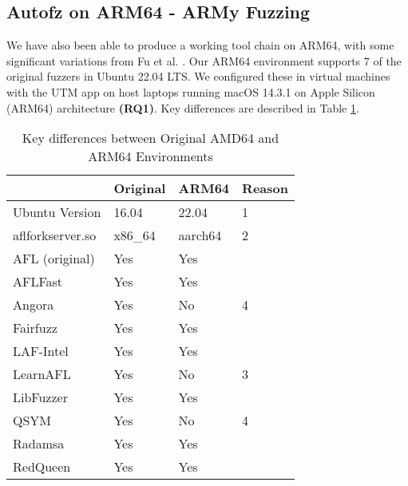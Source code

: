 \subsection{Autofz on ARM64 - ARMy Fuzzing}

We have also been able to produce a working tool chain on ARM64, with some significant 
variations from Fu et al. \cite{fu_autofz_2023}. Our ARM64 environment supports 7 of 
the original fuzzers in Ubuntu 22.04 LTS. We configured these in virtual machines 
with the UTM app on host laptops running macOS 14.3.1 on Apple Silicon (ARM64) 
architecture \textbf{(RQ1)}. Key differences are described in Table \ref{arm64-characteristics}.

\begin{table}[ht]
    \begin{tabular}{|l|l|l|l|}
        \hline
                        & Original\cite{fu_autofz_2023} & ARM64 & Reason \\
        \hline
        Ubuntu Version  & 16.04             & 22.04 & 1 \\
        \hline
        aflforkserver.so    & x86\_64           & aarch64 & 2 \\
        \hline
        AFL (original)  & Yes               & Yes & \\
        \hline
        AFLFast         & Yes               & Yes & \\
        \hline
        Angora          & Yes               & No & 4 \\
        \hline
        Fairfuzz        & Yes               & Yes & \\
        \hline
        LAF-Intel       & Yes               & Yes & \\
        \hline
        LearnAFL        & Yes               & No & 3 \\
        \hline
        LibFuzzer       & Yes               & Yes & \\
        \hline
        QSYM            & Yes               & No & 4 \\
        \hline
        Radamsa         & Yes               & Yes & \\
        \hline
        RedQueen        & Yes               & Yes & \\
        \hline
    \end{tabular}
    \caption{Key differences between Original AMD64 and ARM64 Environments}
    \label{arm64-characteristics}
\end{table}

